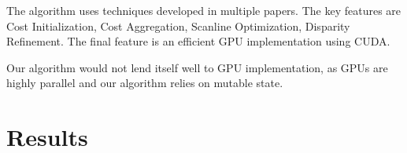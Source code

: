 \documentclass[12pt]{article}
\begin{document}
The algorithm uses techniques developed in multiple papers. The key features
are Cost Initialization, Cost Aggregation, Scanline Optimization, Disparity
Refinement. The final feature is an efficient GPU implementation using CUDA. 

Our algorithm would not lend itself well to GPU implementation, as GPUs are
highly parallel and our algorithm relies on mutable state.


\section{Results}






\end{document}
